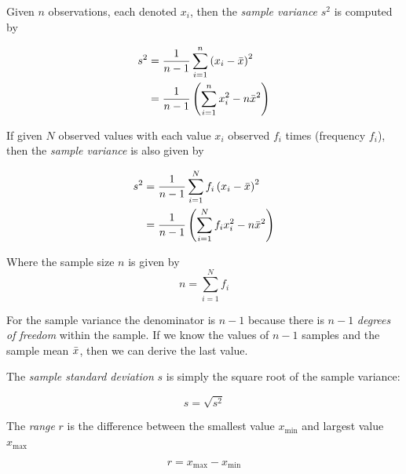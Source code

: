 \begin{definition}
    Given $n$ observations, each denoted $x_i$, then the \textit{sample variance} $s^2$ is computed by
    
    \begin{align}
        s^2 &= \frac{1}{n-1} \sum \limits_{i=1}^{n} \left(x_i - \Bar{x}\right)^2 \\
        &= \frac{1}{n-1} \left( \sum \limits_{i=1}^{n} x^2_i - n\Bar{x}^2 \right)
    \end{align}
    
    If given $N$ observed values with each value $x_i$ observed $f_i$ times (frequency $f_i$), then the \textit{sample variance} is also given by
    
    \begin{align}
        s^2 &= \frac{1}{n-1} \sum \limits_{i=1}^{N} f_i \left( x_i - \Bar{x} \right)^2 \\
        &= \frac{1}{n-1} \left( \sum \limits_{i=1}^{N} f_i x_i^2 - n \Bar{x}^2 \right)
    \end{align}

    Where the sample size $n$ is given by
    \begin{equation}
        n = \sum \limits_{i=1}^{N} f_i
    \end{equation}
\end{definition}

\begin{remark}
    For the sample variance the denominator is $n - 1$ because there is $n - 1$ \textit{degrees of freedom} within the sample. If we know the values of $n - 1$ samples and the sample mean $\Bar{x}$, then we can derive the last value.
\end{remark}

\begin{definition}
    The \textit{sample standard deviation} $s$ is simply the square root of the sample variance:
    
    \begin{equation}
        s = \sqrt{s^2}
    \end{equation}
\end{definition}

\begin{definition}[Range]
    The \textit{range} $r$ is the difference between the smallest value $x_\text{min}$ and largest value $x_\text{max}$
    
    \begin{equation}
        r = x_\text{max} - x_\text{min}
    \end{equation}
\end{definition}

